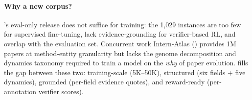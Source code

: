 \paragraph{Why a new corpus?} \ideaevolving's eval-only release does not
suffice for training: the 1{,}029 instances are too few for supervised
fine-tuning, lack evidence-grounding for verifier-based RL, and overlap with
the evaluation set. Concurrent work Intern-Atlas () provides 1M papers at method-entity granularity but lacks the
genome decomposition and dynamics taxonomy required to train a model on the
\emph{why} of paper evolution. \genetrace{} fills the gap between these two:
training-scale (5K--50K), structured (six fields + five dynamics), grounded
(per-field evidence quotes), and reward-ready (per-annotation verifier
scores).
